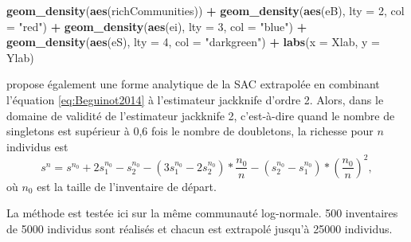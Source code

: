 \documentclass[
  11pt,
  french,
  a4paper,
  extrafontsizes,onecolumn,openright
  ]{memoir}
\newenvironment{Shaded}{\begin{snugshade}}{\end{snugshade}}
\newcommand{\AttributeTok}[1]{\textcolor[rgb]{0.13,0.29,0.53}{#1}}
\newcommand{\DecValTok}[1]{\textcolor[rgb]{0.00,0.00,0.81}{#1}}
\newcommand{\FunctionTok}[1]{\textcolor[rgb]{0.13,0.29,0.53}{\textbf{#1}}}
\newcommand{\NormalTok}[1]{#1}
\newcommand{\SpecialCharTok}[1]{\textcolor[rgb]{0.81,0.36,0.00}{\textbf{#1}}}
\newcommand{\StringTok}[1]{\textcolor[rgb]{0.31,0.60,0.02}{#1}}
\begin{document}
\begin{Shaded}
\begin{Highlighting}[]
  \FunctionTok{geom\_density}\NormalTok{(}\FunctionTok{aes}\NormalTok{(richCommunities)) }\SpecialCharTok{+}
  \FunctionTok{geom\_density}\NormalTok{(}\FunctionTok{aes}\NormalTok{(eB), }\AttributeTok{lty =} \DecValTok{2}\NormalTok{, }\AttributeTok{col =} \StringTok{"red"}\NormalTok{) }\SpecialCharTok{+}
  \FunctionTok{geom\_density}\NormalTok{(}\FunctionTok{aes}\NormalTok{(ei), }\AttributeTok{lty =} \DecValTok{3}\NormalTok{, }\AttributeTok{col =} \StringTok{"blue"}\NormalTok{) }\SpecialCharTok{+}
  \FunctionTok{geom\_density}\NormalTok{(}\FunctionTok{aes}\NormalTok{(eS), }\AttributeTok{lty =} \DecValTok{4}\NormalTok{, }\AttributeTok{col =} \StringTok{"darkgreen"}\NormalTok{) }\SpecialCharTok{+}
  \FunctionTok{labs}\NormalTok{(}\AttributeTok{x =}\NormalTok{ Xlab, }\AttributeTok{y =}\NormalTok{ Ylab)}
\end{Highlighting}
\end{Shaded}

\normalsize

\textcite{Beguinot2015a} propose également une forme analytique de la SAC extrapolée en combinant l'équation \eqref{eq:Beguinot2014} à l'estimateur jackknife d'ordre 2.
Alors, dans le domaine de validité de l'estimateur jackknife 2, c'est-à-dire quand le nombre de singletons est supérieur à 0,6 fois le nombre de doubletons, la richesse pour \(n\) individus est
\begin{equation}
  \label{eq:Beguinot2015a}
  s^{n}
  = s^{n_0}
  +2s^{n_0}_{1}-s^{n_0}_{2}
  -\left(3s^{n_0}_{1}-2s^{n_0}_{2}\right)*\frac{n_0}{n}
  -\left(s^{n_0}_{2}-s^{n_0}_{1}\right)*\left(\frac{n_0}{n}\right)^2,
\end{equation}
où \(n_0\) est la taille de l'inventaire de départ.

La méthode est testée ici sur la même communauté log-normale.
500 inventaires de 5000 individus sont réalisés et chacun est extrapolé jusqu'à 25000 individus.

\scriptsize
\end{document}
